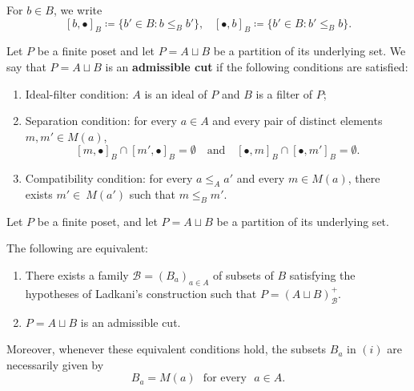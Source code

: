 For $ b\in B$, we write 
\[[b, \bullet]_B \coloneq \{b' \in B \colon b \leq_Bb'\}, \,\,\,\,\, [\bullet,b]_B \coloneq \{b'\in B \colon b' \leq_Bb\}.\]

\begin{definition} %
\label{def admissible cuts}
   Let $P$ be a finite poset and let $P=A \sqcup B$ be a partition of its underlying set. 
   We say that $P=A \sqcup B$ is an \textbf{admissible cut} if the following conditions are satisfied:
\begin{enumerate}
    \item [(a)] Ideal-filter condition: $A$ is an ideal of $P$ and $B$ is a filter of $P$;
    \item [(b)]  Separation condition: for every $ a \in A$ and every pair of distinct elements $m, m' \in M(a)$, \[[m, \bullet]_B \cap [m', \bullet]_B = \emptyset \,\,\,\, \text{ and } \,\,\,\, [\bullet, m]_B \cap [\bullet, m']_B = \emptyset.\]
    \item [(c)] Compatibility condition: for every $a \leq_A a'$ and every $m \in M(a)$, there exists $m'\in~M(a')$ such that $m \leq_B m'$.
\end{enumerate}
\end{definition}

\begin{theorem} %
\label{generalizzazione teomio}
    Let $P$ be a finite poset, and let $P=A \sqcup B$ be a partition of its underlying set.

     The following are equivalent: 
     \begin{enumerate}
    \item There exists a family $\mathcal{B}=(B_a)_{a \in A}$ of subsets of $B$ satisfying the hypotheses of Ladkani's construction such that $P=(A \sqcup B)^+_{\mathcal{B}}$.
    
    \item $P=A \sqcup B$ is an admissible cut.
    \end{enumerate}
   Moreover, whenever these equivalent conditions hold, the subsets $B_a$ in $(i)$ are necessarily given by 
   \[B_a=M(a) \,\, \text{ for every } \,\, a \in A.\]

\end{theorem}

